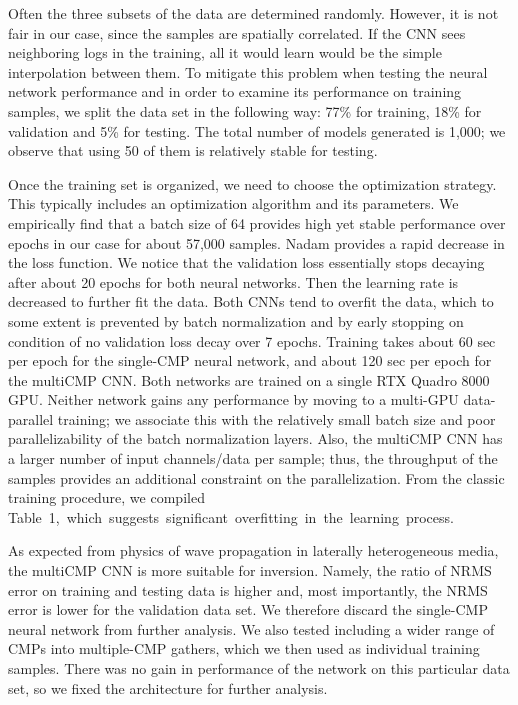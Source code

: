 \documentclass[paper,twocolomn]{geophysics}
\begin{document}
Often the three subsets of the data are determined randomly. However, it is not fair in our case, since the samples are spatially correlated. If the CNN sees neighboring logs in the training, all it would learn would be the simple interpolation between them. To mitigate this problem when testing the neural network performance and in order to examine its performance on training samples, we split the data set in the following way: 77\% for training, 18\% for validation and 5\% for testing. The total number of models generated is 1,000; we observe that using 50 of them is relatively stable for testing.

Once the training set is organized, we need to choose the optimization strategy. This typically includes an optimization algorithm and its parameters. We empirically find that a batch size of 64 provides high yet stable performance over epochs in our case for about 57,000 samples. Nadam provides a rapid decrease in the loss function. We notice that the validation loss essentially stops decaying after about 20 epochs for both neural networks. Then the learning rate is decreased to further fit the data. Both CNNs tend to overfit the data, which to some extent is prevented by batch normalization and by early stopping on condition of no validation loss decay over 7 epochs. Training takes about 60 sec per epoch for the single-CMP neural network, and about 120 sec per epoch for the multiCMP CNN. Both networks are trained on a single RTX Quadro 8000 GPU. Neither network gains any performance by moving to a multi-GPU data-parallel training; we associate this with the relatively small batch size and poor parallelizability of the batch normalization layers. Also, the multiCMP CNN has a larger number of input channels/data per sample; thus, the throughput of the samples provides an additional constraint on the parallelization. From the classic training procedure, we compiled Table~1,~which~suggests~significant~overfitting~in~the~learning~process.

As expected from physics of wave propagation in laterally heterogeneous media, the multiCMP CNN is more suitable for inversion. Namely, the ratio of NRMS error on training and testing data is higher and, most importantly, the NRMS error is lower for the validation data set. We therefore discard the single-CMP neural network from further analysis. We also tested including a wider range of CMPs into multiple-CMP gathers, which we then used as individual training samples. There was no gain in performance of the network on this particular data set, so we fixed the architecture for further analysis.
%
\end{document}
